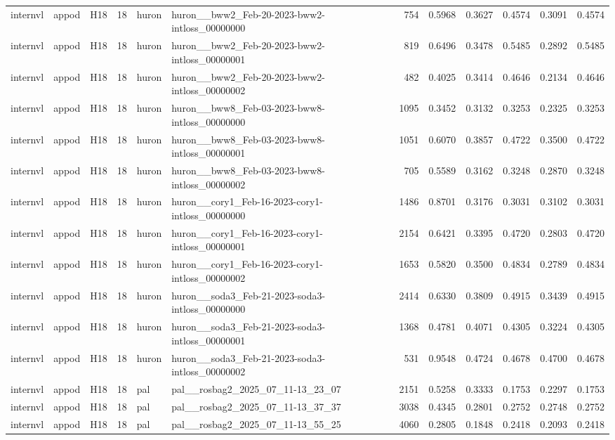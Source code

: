 \begin{table}[tbp]
\begin{tabular}{lllrllrrrrrr}
internvl & appod & H18 & 18 & huron & huron\_\_bww2\_Feb-20-2023-bww2-intloss\_00000000 & 754 & 0.5968 & 0.3627 & 0.4574 & 0.3091 & 0.4574 \\
internvl & appod & H18 & 18 & huron & huron\_\_bww2\_Feb-20-2023-bww2-intloss\_00000001 & 819 & 0.6496 & 0.3478 & 0.5485 & 0.2892 & 0.5485 \\
internvl & appod & H18 & 18 & huron & huron\_\_bww2\_Feb-20-2023-bww2-intloss\_00000002 & 482 & 0.4025 & 0.3414 & 0.4646 & 0.2134 & 0.4646 \\
internvl & appod & H18 & 18 & huron & huron\_\_bww8\_Feb-03-2023-bww8-intloss\_00000000 & 1095 & 0.3452 & 0.3132 & 0.3253 & 0.2325 & 0.3253 \\
internvl & appod & H18 & 18 & huron & huron\_\_bww8\_Feb-03-2023-bww8-intloss\_00000001 & 1051 & 0.6070 & 0.3857 & 0.4722 & 0.3500 & 0.4722 \\
internvl & appod & H18 & 18 & huron & huron\_\_bww8\_Feb-03-2023-bww8-intloss\_00000002 & 705 & 0.5589 & 0.3162 & 0.3248 & 0.2870 & 0.3248 \\
internvl & appod & H18 & 18 & huron & huron\_\_cory1\_Feb-16-2023-cory1-intloss\_00000000 & 1486 & 0.8701 & 0.3176 & 0.3031 & 0.3102 & 0.3031 \\
internvl & appod & H18 & 18 & huron & huron\_\_cory1\_Feb-16-2023-cory1-intloss\_00000001 & 2154 & 0.6421 & 0.3395 & 0.4720 & 0.2803 & 0.4720 \\
internvl & appod & H18 & 18 & huron & huron\_\_cory1\_Feb-16-2023-cory1-intloss\_00000002 & 1653 & 0.5820 & 0.3500 & 0.4834 & 0.2789 & 0.4834 \\
internvl & appod & H18 & 18 & huron & huron\_\_soda3\_Feb-21-2023-soda3-intloss\_00000000 & 2414 & 0.6330 & 0.3809 & 0.4915 & 0.3439 & 0.4915 \\
internvl & appod & H18 & 18 & huron & huron\_\_soda3\_Feb-21-2023-soda3-intloss\_00000001 & 1368 & 0.4781 & 0.4071 & 0.4305 & 0.3224 & 0.4305 \\
internvl & appod & H18 & 18 & huron & huron\_\_soda3\_Feb-21-2023-soda3-intloss\_00000002 & 531 & 0.9548 & 0.4724 & 0.4678 & 0.4700 & 0.4678 \\
internvl & appod & H18 & 18 & pal & pal\_\_rosbag2\_2025\_07\_11-13\_23\_07 & 2151 & 0.5258 & 0.3333 & 0.1753 & 0.2297 & 0.1753 \\
internvl & appod & H18 & 18 & pal & pal\_\_rosbag2\_2025\_07\_11-13\_37\_37 & 3038 & 0.4345 & 0.2801 & 0.2752 & 0.2748 & 0.2752 \\
internvl & appod & H18 & 18 & pal & pal\_\_rosbag2\_2025\_07\_11-13\_55\_25 & 4060 & 0.2805 & 0.1848 & 0.2418 & 0.2093 & 0.2418 \\

\end{tabular}
\end{table}
